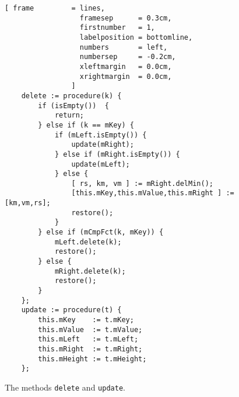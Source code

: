 \begin{figure}[!ht]
\centering
\begin{Verbatim}[ frame         = lines, 
                  framesep      = 0.3cm, 
                  firstnumber   = 1,
                  labelposition = bottomline,
                  numbers       = left,
                  numbersep     = -0.2cm,
                  xleftmargin   = 0.0cm,
                  xrightmargin  = 0.0cm,
                ]
    delete := procedure(k) {
        if (isEmpty())  { 
            return; 
        } else if (k == mKey) {
            if (mLeft.isEmpty()) {
                update(mRight);
            } else if (mRight.isEmpty()) {
                update(mLeft);
            } else {
                [ rs, km, vm ] := mRight.delMin();
                [this.mKey,this.mValue,this.mRight ] := [km,vm,rs];
                restore();
            }
        } else if (mCmpFct(k, mKey)) {
            mLeft.delete(k);
            restore();
        } else {
            mRight.delete(k);
            restore();
        }
    };
    update := procedure(t) {
        this.mKey    := t.mKey;
        this.mValue  := t.mValue;
        this.mLeft   := t.mLeft;
        this.mRight  := t.mRight;
        this.mHeight := t.mHeight;
    };
\end{Verbatim}
\vspace*{-0.3cm}
\caption{The methods \texttt{delete} and \texttt{update}.}
\label{fig:avl-tree.stlx:delete}
\end{figure}
